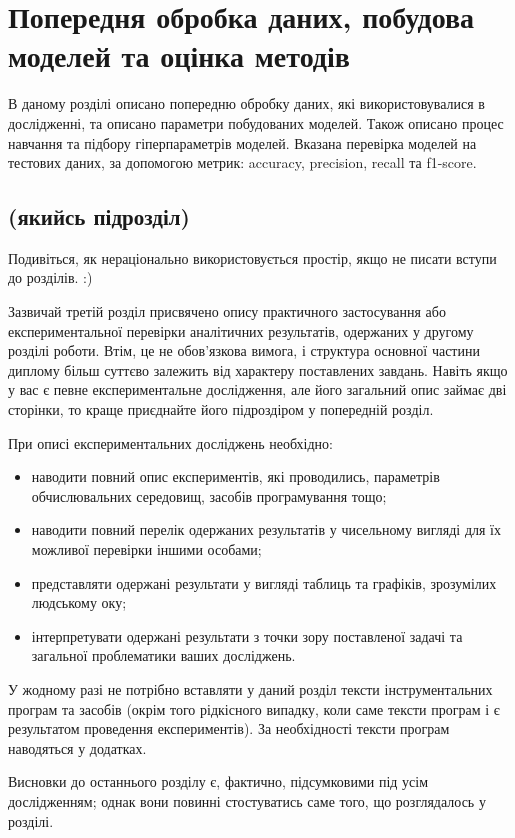 \chapter{Попередня обробка даних, побудова моделей та оцінка методів}
\label{chap:practice}

В даному розділі описано попередню обробку даних, які використовувалися в дослідженні, та описано параметри побудованих моделей. Також описано процес навчання та підбору гіперпараметрів моделей. Вказана перевірка моделей на тестових даних, за допомогою метрик: accuracy, precision, recall та f1-score.

\section{(якийсь підрозділ)}

Подивіться, як нераціонально використовується простір, якщо не писати 
вступи до розділів. :)

Зазвичай третій розділ присвячено опису практичного застосування або 
експериментальної перевірки аналітичних результатів, одержаних у другому 
розділі роботи. Втім, це не обов'язкова вимога, і структура основної 
частини диплому більш суттєво залежить від характеру поставлених завдань. 
Навіть якщо у вас є певне експериментальне дослідження, але його загальний 
опис займає дві сторінки, то краще приєднайте його підроздіром у 
попередній розділ.

При описі експериментальних досліджень необхідно:

\begin{itemize}
\item наводити повний опис експериментів, які проводились, параметрів 
обчислювальних середовищ, засобів програмування тощо;
\item наводити повний перелік одержаних результатів у чисельному вигляді для їх можливої 
перевірки іншими особами;
\item представляти одержані результати у вигляді таблиць та графіків, 
зрозумілих людському оку;
\item інтерпретувати одержані результати з точки зору поставленої задачі 
та загальної проблематики ваших досліджень.
\end{itemize}

У жодному разі не потрібно вставляти у даний розділ тексти 
інструментальних програм та засобів (окрім того рідкісного випадку, коли 
саме тексти програм і є результатом проведення експериментів). За 
необхідності тексти програм наводяться у додатках.


\chapconclude{\ref{chap:practice}}

Висновки до останнього розділу є, фактично, підсумковими під усім 
дослідженням; однак вони повинні стостуватись саме того, що розглядалось у 
розділі.